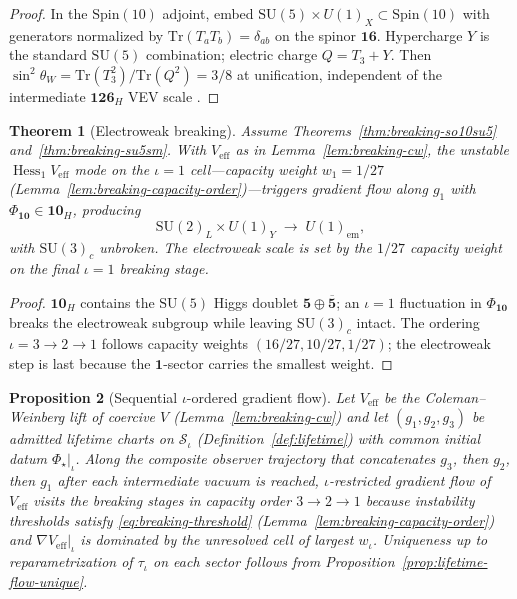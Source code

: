 \documentclass[11pt]{article}
\theoremstyle{plain}
\newtheorem{theorem}{Theorem}[section]
\newtheorem{proposition}[theorem]{Proposition}
\theoremstyle{definition}
\theoremstyle{remark}
\numberwithin{equation}{section}
\newcommand{\Spin}{\mathrm{Spin}}
\newcommand{\orderparam}{\Phi}
\newcommand{\Hess}{\operatorname{Hess}}
\begin{document}
\begin{proof}
In the $\Spin(10)$ adjoint, embed
$\mathrm{SU}(5)\times U(1)_X\subset\Spin(10)$ with generators normalized by
$\mathrm{Tr}(T_aT_b)=\delta_{ab}$ on the spinor $\mathbf{16}$. Hypercharge
$Y$ is the standard $\mathrm{SU}(5)$ combination; electric charge
$Q=T_3+Y$. Then
$\sin^2\theta_W=\mathrm{Tr}(T_3^2)/\mathrm{Tr}(Q^2)=3/8$ at unification,
independent of the intermediate $\mathbf{126}_H$ VEV scale
\cite{GeorgiGlashow1974,Witten1985}.
\end{proof}

\begin{theorem}[Electroweak breaking]\label{thm:breaking-ew}
Assume Theorems~\ref{thm:breaking-so10su5} and~\ref{thm:breaking-su5sm}.
With $V_{\mathrm{eff}}$ as in Lemma~\ref{lem:breaking-cw}, the unstable
$\Hess_1 V_{\mathrm{eff}}$ mode on the $\iota=1$ cell---capacity weight
$w_1=1/27$ (Lemma~\ref{lem:breaking-capacity-order})---triggers gradient flow
along $g_1$ with $\Phi_{\mathbf{10}}\in\mathbf{10}_H$, producing
\begin{equation}\label{eq:breaking-ew}
  \mathrm{SU}(2)_L\times U(1)_Y
  \;\longrightarrow\;
  U(1)_{\mathrm{em}},
\end{equation}
with $\mathrm{SU}(3)_c$ unbroken. The electroweak scale is set by the
$1/27$ capacity weight on the final $\iota=1$ breaking stage.
\end{theorem}

\begin{proof}
$\mathbf{10}_H$ contains the $\mathrm{SU}(5)$ Higgs doublet
$\mathbf{5}\oplus\overline{\mathbf{5}}$; an $\iota=1$ fluctuation in
$\Phi_{\mathbf{10}}$ breaks the electroweak subgroup while leaving
$\mathrm{SU}(3)_c$ intact. The ordering $\iota=3\to2\to1$ follows capacity
weights $(16/27,10/27,1/27)$; the electroweak step is last because the
$\mathbf{1}$-sector carries the smallest weight.
\end{proof}

\begin{proposition}[Sequential $\iota$-ordered gradient flow]
\label{prop:breaking-sequential}
Let $V_{\mathrm{eff}}$ be the Coleman--Weinberg lift of coercive $V$
(Lemma~\ref{lem:breaking-cw}) and let $(g_1,g_2,g_3)$ be admitted lifetime
charts on $\mathcal{S}_\iota$ (Definition~\ref{def:lifetime}) with common
initial datum $\orderparam_\star|_\iota$. Along the composite observer trajectory
that concatenates $g_3$, then $g_2$, then $g_1$ after each intermediate vacuum is
reached, $\iota$-restricted gradient flow of $V_{\mathrm{eff}}$ visits the
breaking stages in capacity order $3\to2\to1$ because instability thresholds
satisfy \eqref{eq:breaking-threshold} (Lemma~\ref{lem:breaking-capacity-order})
and $\nabla V_{\mathrm{eff}}|_\iota$ is dominated by the unresolved cell of
largest $w_\iota$. Uniqueness up to reparametrization of $\tau_\iota$ on each
sector follows from Proposition~\ref{prop:lifetime-flow-unique}.
\end{proposition}
\end{document}
